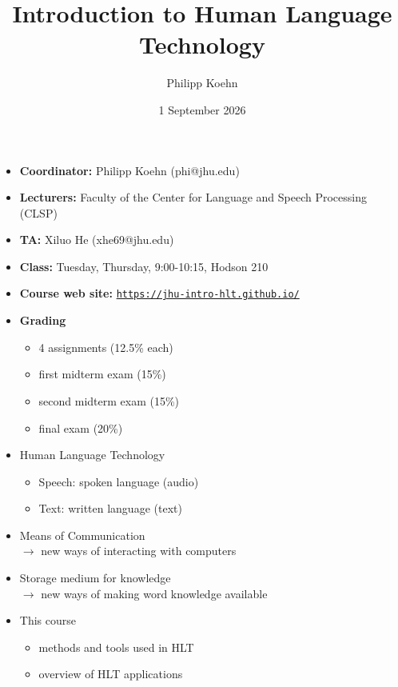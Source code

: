 \documentclass[landscape]{jhuslides3C}
\begin{document}
\rm
\title[Introduction to Human Language Technology: Introduction]{Introduction to Human Language Technology}
\author[Philipp Koehn]{Philipp Koehn}
\date{1 September 2026}
\maketitle


\vfill
\begin{itemize} \itemsep 0mm
\item \textbf{Coordinator:} Philipp Koehn (phi@jhu.edu)
\item \textbf{Lecturers:} Faculty of the Center for Language and Speech Processing (CLSP)
\item \textbf{TA:} Xiluo He (xhe69@jhu.edu)
\item \textbf{Class:} Tuesday, Thursday, 9:00-10:15, Hodson 210
\item \textbf{Course web site:} \href{https://jhu-intro-hlt.github.io/}{\tt https://jhu-intro-hlt.github.io/}
\item \textbf{Grading} \vspace{-3mm}
\begin{itemize}
\item 4 assignments (12.5\% each)
\item first midterm exam (15\%)
\item second midterm exam (15\%)
\item final exam (20\%)
\end{itemize}
\end{itemize}
\vfill


\vfill
\begin{itemize}
\item Human Language Technology
\begin{itemize}
\item Speech: spoken language (audio)
\item Text: written language (text)
\end{itemize}
\item Means of Communication\\
$\rightarrow$ new ways of interacting with computers
\item Storage medium for knowledge\\
$\rightarrow$ new ways of making word knowledge available
\item This course
\begin{itemize}
\item methods and tools used in HLT
\item overview of HLT applications
\end{itemize}
\end{itemize}
\vfill
\end{document}
